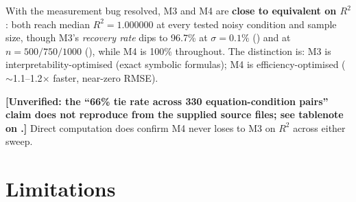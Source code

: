 \documentclass[twoside,11pt]{article}
\newcommand{\Rsq}{R^{2}}
\begin{document}
With the measurement bug resolved, M3 and M4 are \textbf{close to
equivalent on $\Rsq$}: both reach median $\Rsq = 1.000000$ at every
tested noisy condition and sample size, though M3's \emph{recovery
rate} dips to 96.7\% at $\sigma=0.1\%$ () and at
$n=500/750/1000$ (), while M4 is 100\% throughout.
The distinction is: M3 is interpretability-optimised (exact symbolic
formulas); M4 is efficiency-optimised ($\sim$1.1--1.2$\times$ faster,
near-zero RMSE).

\textbf{[Unverified: the ``66\% tie rate across 330 equation-condition
pairs'' claim does not reproduce from the supplied source files; see
tablenote on .]} Direct computation does confirm M4
never loses to M3 on $\Rsq$ across either sweep.

\section{Limitations}
\label{suppb:limitations}
\end{document}
